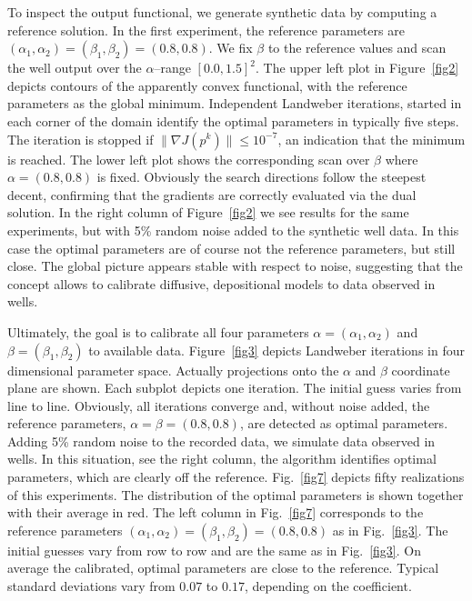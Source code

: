 To inspect the output functional,
we generate synthetic data by computing a reference solution.
In the first experiment, the reference parameters are
$(\alpha_1, \alpha_2)=(\beta_1, \beta_2)=(0.8,0.8)$.
We fix $\beta$ to the reference values and scan the well output over the $\alpha$--range $[0.0, 1.5]^2$.
The upper left plot in Figure~\ref{fig2} depicts contours of the apparently convex functional,
with the reference parameters as the global minimum.
Independent Landweber iterations, started in each corner of the domain 
identify the optimal parameters in typically five steps.
The iteration is stopped if $\| \nabla J(p^k) \| \le 10^{-7}$, an indication that the minimum is reached.
The lower left plot shows the corresponding scan over $\beta$ where $\alpha=(0.8,0.8)$ is fixed. 
Obviously the search directions follow the steepest decent,
confirming that the gradients are correctly evaluated via the dual solution.
In the right column of Figure~\ref{fig2} we see results for the same experiments, 
but with 5\% random noise added to the synthetic well data.
In this case the optimal parameters are of course not the reference parameters, but still close.
The global picture appears stable with respect to noise, 
suggesting that the concept allows to calibrate diffusive, depositional models to data observed in wells.

Ultimately, the goal is to calibrate all four parameters 
$\alpha = (\alpha_1, \alpha_2)$ and $\beta = (\beta_1, \beta_2)$
to available data. 
Figure~\ref{fig3} depicts Landweber iterations in four dimensional parameter space.
Actually projections onto the $\alpha$ and $\beta$ coordinate plane are shown.
Each subplot depicts one iteration. 
The initial guess varies from line to line.
Obviously, all iterations converge and, without noise added,
the reference parameters, $\alpha = \beta = (0.8, 0.8)$, are detected as optimal parameters.
Adding 5\% random noise to the recorded data, we simulate data observed in wells.
In this situation, see the right column, 
the algorithm identifies optimal parameters, which are clearly off the reference.
Fig.~\ref{fig7} depicts fifty realizations of this experiments.
The distribution of the optimal parameters is shown together with their average in red.
The left column in Fig.~\ref{fig7} corresponds to the reference parameters 
$(\alpha_1, \alpha_2)=(\beta_1, \beta_2)=(0.8,0.8)$ as in Fig.~\ref{fig3}.
The initial guesses vary from row to row and are the same as in Fig.~\ref{fig3}. 
On average the calibrated, optimal parameters are close to the reference. 
Typical standard deviations vary from $0.07$ to $0.17$, depending on the coefficient.

